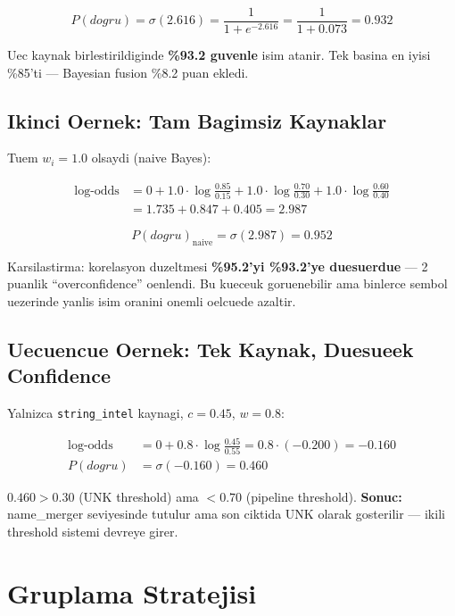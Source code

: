 \documentclass[12pt,a4paper,oneside]{book}
\theoremstyle{definition}
\newcommand{\code}[1]{\texttt{\color{green!60!white}#1}}
\newcommand{\prob}[1]{P\!\left(#1\right)}
\newcommand{\sigmoid}{\sigma}
\begin{document}
\begin{equation}
\prob{dogru} = \sigmoid(2.616) = \frac{1}{1 + e^{-2.616}} = \frac{1}{1 + 0.073} = 0.932
\end{equation}

\begin{basari}[Sonuc]
Uec kaynak birlestirildiginde \textbf{\%93.2 guvenle} isim atanir. Tek basina en iyisi \%85'ti --- Bayesian fusion \%8.2 puan ekledi.
\end{basari}

\subsection{Ikinci Oernek: Tam Bagimsiz Kaynaklar}

Tuem $w_i = 1.0$ olsaydi (naive Bayes):

\begin{align}
\text{log-odds} &= 0 + 1.0 \cdot \log\frac{0.85}{0.15} + 1.0 \cdot \log\frac{0.70}{0.30} + 1.0 \cdot \log\frac{0.60}{0.40} \\
&= 1.735 + 0.847 + 0.405 = 2.987
\end{align}

\begin{equation}
\prob{dogru}_{\text{naive}} = \sigmoid(2.987) = 0.952
\end{equation}

Karsilastirma: korelasyon duzeltmesi \textbf{\%95.2'yi \%93.2'ye duesuerdue} --- 2 puanlik ``overconfidence'' oenlendi. Bu kueceuk goruenebilir ama binlerce sembol uezerinde yanlis isim oranini onemli oelcuede azaltir.

\subsection{Uecuencue Oernek: Tek Kaynak, Duesueek Confidence}

Yalnizca \code{string\_intel} kaynagi, $c = 0.45$, $w = 0.8$:

\begin{align}
\text{log-odds} &= 0 + 0.8 \cdot \log\frac{0.45}{0.55} = 0.8 \cdot (-0.200) = -0.160 \\
\prob{dogru} &= \sigmoid(-0.160) = 0.460
\end{align}

$0.460 > 0.30$ (UNK threshold) ama $< 0.70$ (pipeline threshold). \textbf{Sonuc:} name\_merger seviyesinde tutulur ama son ciktida UNK olarak gosterilir --- ikili threshold sistemi devreye girer.

\section{Gruplama Stratejisi}
\label{sec:grouping}
\end{document}

